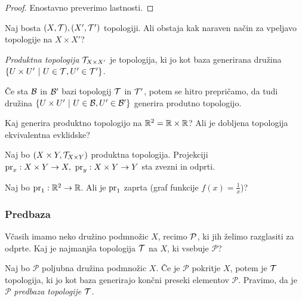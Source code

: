\begin{proof}
    Enostavno preverimo lastnosti.
\end{proof}

\begin{primer}
    Naj bosta $(X, \mathcal{T}), (X', \mathcal{T}')$ topologiji. Ali obstaja kak naraven način za vpeljavo topologije na $X \times X'$?
\end{primer}
    
\begin{definicija}
    \emph{Produktna topologija} $\mathcal{T}_{X \times X'}$ je topologija, ki jo kot baza generirana družina $\left\{U \times U' \ | \ U \in \mathcal{T}, U' \in \mathcal{T}'\right\}$.
\end{definicija}

\begin{opomba}
    Če sta $\mathcal{B}$ in $\mathcal{B}'$ bazi topologij $\mathcal{T}$ in $\mathcal{T}'$, potem se hitro prepričamo, da tudi družina $\left\{U \times U' \ | \ U \in \mathcal{B}, U' \in \mathcal{B}'\right\}$ generira produtno topologijo.
\end{opomba}

\begin{primer}
    Kaj generira produktno topologijo na $\mathbb{R}^2 = \mathbb{R} \times \mathbb{R}$? Ali je dobljena topologija ekvivalentna evklidske?
\end{primer}

\begin{trditev}
    Naj bo $(X \times Y, \mathcal{T}_{X \times Y})$ produktna topologija. Projekciji $\operatorname{pr}_x: X \times Y \to X, \ \operatorname{pr}_y: X \times Y \to Y$ sta zvezni in odprti.
\end{trditev}

\begin{primer} 
    Naj bo $\operatorname{pr}_1: \mathbb{R}^2 \to \mathbb{R}$. Ali je $\operatorname{pr}_1$ zaprta (graf funkcije $f(x) = \frac{1}{x}$)?    
\end{primer}

\subsubsection{Predbaza}

Včasih imamo neko družino podmnožic $X$, recimo $\mathcal{P}$, ki jih želimo razglasiti za odprte. Kaj je najmanjša topologija $\mathcal{T}$ na $X$, ki vsebuje $\mathcal{P}$?

\begin{trditev}
    Naj bo $\mathcal{P}$ poljubna družina podmnožic $X$. Če je $\mathcal{P}$ pokritje $X$, potem je $\mathcal{T}$ topologija, ki jo kot baza generirajo končni preseki elementov $\mathcal{P}$.
    Pravimo, da je $\mathcal{P}$ \emph{predbaza topologije $\mathcal{T}$}.
\end{trditev}

